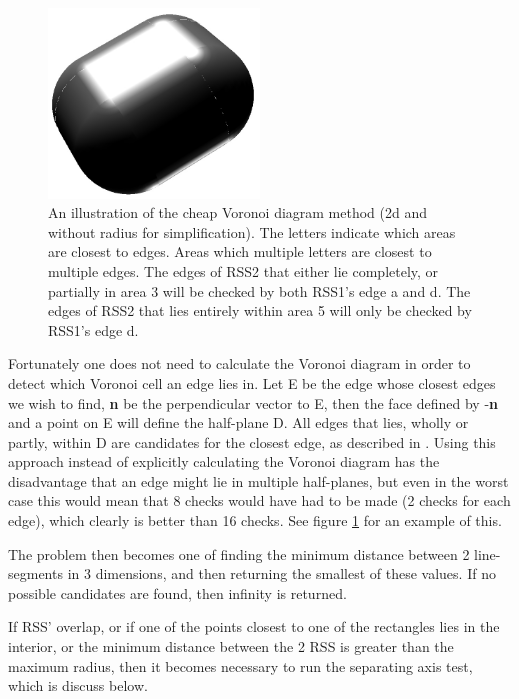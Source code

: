 \begin{figure}
\centering
\includegraphics[width=0.5\textwidth]{figures/vorCheap}
\caption{\label{vor-cheap}An illustration of the cheap Voronoi diagram method (2d and without radius for simplification). The letters indicate which areas are closest to edges. Areas which multiple letters are closest to multiple edges. The edges of RSS2 that either lie completely, or partially in area 3 will be checked by both RSS1's edge a and d. The edges of RSS2 that lies entirely within area 5 will only be checked by RSS1's edge d.}
\end{figure}

Fortunately one does not need to calculate the Voronoi diagram in order to detect which Voronoi cell an edge lies in. Let E be the edge whose closest edges we wish to find, \textbf{n} be the perpendicular vector to E, then the face defined by -\textbf{n} and a point on E will define the half-plane D. All edges that lies, wholly or partly, within D are candidates for the closest edge, as described in \cite{larsen00fast}. Using this approach instead of explicitly calculating the Voronoi diagram has the disadvantage that an edge might lie in multiple half-planes, but even in the worst case this would mean that 8 checks would have had to be made (2 checks for each edge), which clearly is better than 16 checks. See figure \ref{vor-cheap} for an example of this.

The problem then becomes one of finding the minimum distance between 2 line-segments in 3 dimensions, and then returning the smallest of these values. If no possible candidates are found, then infinity is returned.

If RSS' overlap, or if one of the points closest to one of the rectangles lies in the interior, or the minimum distance between the 2 RSS is greater than the maximum radius, then it becomes necessary to run the separating axis test, which is discuss below.

